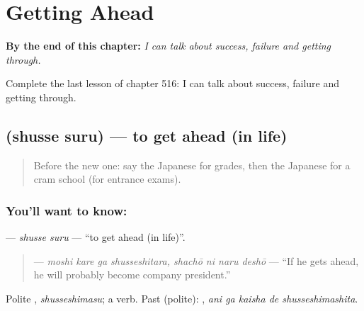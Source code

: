 
\chapter{Getting Ahead}
\label{ch:ja-getting-ahead}

\begin{chapteropening}
\textbf{By the end of this chapter:} \emph{I can talk about success, failure and getting through.}

Complete the last lesson of chapter 516: I can talk about success, failure and getting through.
\end{chapteropening}

\section[\texorpdfstring{\ja{しゅっせする} (shusse suru)}{しゅっせする (shusse suru)}]{ (shusse suru) — to get ahead (in life)}

\label{lesson:JA-C516-shusse-suru}



\begin{quote}
Before the new one: say the Japanese for grades, then the Japanese for a cram school (for entrance exams).
\end{quote}

\subsection*{You'll want to know: }
\textbf{} — \emph{shusse suru} — \textquotedblleft{}to get ahead (in life)\textquotedblright{}.

\begin{quote}
\textbf{   } — \emph{moshi kare ga shusseshitara, shachō ni naru deshō} — \textquotedblleft{}If he gets ahead, he will probably become company president.\textquotedblright{}
\end{quote}

Polite \textbf{}, \emph{shusseshimasu}; a  verb. Past (polite): \textbf{  }, \emph{ani ga kaisha de shusseshimashita}.


